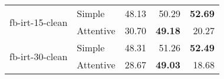 \begin{tabular}{| l | l | r | r | r |}
    \multirow{2}{*}{fb-irt-15-clean}
    & Simple    & 48.13 & 50.29 & \textbf{52.69} \\
    & Attentive & 30.70 & \textbf{49.18} & 20.27 \\ \hline
    
    \multirow{2}{*}{fb-irt-30-clean}
    & Simple    & 48.31 & 51.26 & \textbf{52.49} \\
    & Attentive & 28.67 & \textbf{49.03} & 18.68 \\ \hline

\end{tabular}
